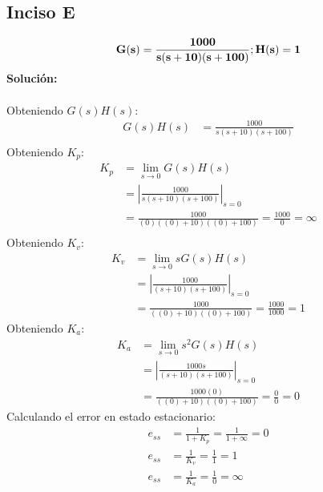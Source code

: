 \documentclass[11pt, twoside]{article}
\begin{document}
\subsection{Inciso E}
\begin{equation*}
    \mathbf{G(s)=\frac{1000}{s(s+10)(s+100)};\space H(s)=1}
\end{equation*}
\textbf{Solución:}\\\\
Obteniendo $G(s)H(s)$:
\begin{align*}
    G(s)H(s) & = \frac{1000}{s(s+10)(s+100)} \\
\end{align*}
Obteniendo $K_{p}$:
\begin{align*}
    K_{p} & = \lim_{s\to 0}{G(s)H(s)}                              \\
          & = \left|\frac{1000}{s(s+10)(s+100)}\right|_{s=0}      \\
          & = \frac{1000}{(0)((0)+10)((0)+100)} = \frac{1000}{0} = \boxed{\infty} \\
\end{align*}
Obteniendo $K_{v}$:
\begin{align*}
    K_{v} & = \lim_{s\to 0}{sG(s)H(s)}                \\
          & = \left|\frac{1000}{(s+10)(s+100)}\right|_{s=0}       \\
          & = \frac{1000}{((0)+10)((0)+100)} = \frac{1000}{1000} = \boxed{1}
\end{align*}
Obteniendo $K_{a}$:
\begin{align*}
    K_{a} & = \lim_{s\to0}{s^{2}G(s)H(s)}                    \\
          & = \left|\frac{1000s}{(s+10)(s+100)}\right|_{s=0}             \\
          & = \frac{1000(0)}{((0)+10)((0)+100)} = \frac{0}{0} = \boxed{0}
\end{align*}
\newpage
Calculando el error en estado estacionario:
\begin{align*}
    e_{ss} & = \frac{1}{1+K_{p}} = \frac{1}{1+\infty} = \boxed{0}              \\
    e_{ss} & = \frac{1}{K_{v}} = \frac{1}{1} = \boxed{1} \\
    e_{ss} & = \frac{1}{K_{a}} = \frac{1}{0} = \boxed{\infty}
\end{align*}
\end{document}
